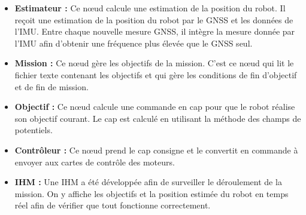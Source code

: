 \begin{itemize}
    \item \textbf{Estimateur :}
    Ce nœud calcule une estimation de la position du robot. Il reçoit une estimation de la position du robot par le GNSS et les données de l’IMU. Entre chaque nouvelle mesure GNSS, il intègre la mesure donnée par l’IMU afin d’obtenir une fréquence plus élevée que le GNSS seul.
    \\
    \item \textbf{Mission :}
    Ce nœud gère les objectifs de la mission. C’est ce nœud qui lit le fichier texte contenant les objectifs et qui gère les conditions de fin d’objectif et de fin de mission.
    \\
    \item \textbf{Objectif :}
    Ce nœud calcule une commande en cap pour que le robot réalise son objectif courant. Le cap est calculé en utilisant la méthode des champs de potentiels.
    \\
    \item \textbf{Contrôleur :}
    Ce nœud prend le cap consigne et le convertit en commande à envoyer aux cartes de contrôle des moteurs.
    \\
    \item \textbf{IHM :}
    Une IHM a été développée afin de surveiller le déroulement de la mission. On y affiche les objectifs et la position estimée du robot en temps réel afin de vérifier que tout fonctionne correctement.
\end{itemize}
